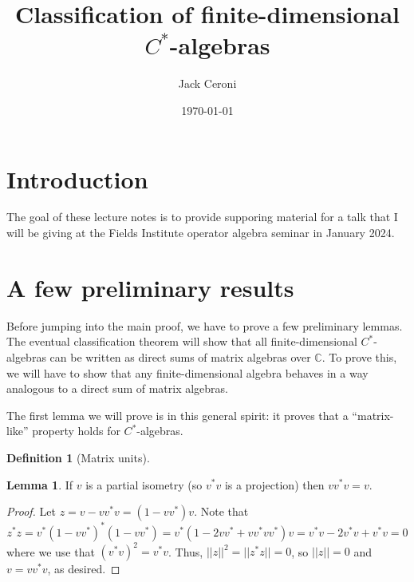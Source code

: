 \documentclass[aps,pra,showpacs,notitlepage,onecolumn,superscriptaddress,nofootinbib]{revtex4-1}
\theoremstyle{definition}
\newtheorem{definition}{Definition}[section]
\newtheorem{lemma}{Lemma}[section]
\begin{document}
\title{Classification of finite-dimensional $C^{*}$-algebras}
\author{Jack Ceroni}

\date{\today}

\maketitle

\section{Introduction}

\noindent The goal of these lecture notes is to provide supporing material for a talk that I will be giving at the Fields Institute operator algebra seminar in January 2024.

\section{A few preliminary results}

\noindent Before jumping into the main proof, we have to prove a few preliminary lemmas. The eventual classification theorem will show that
all finite-dimensional $C^{*}$-algebras can be written as direct sums of matrix algebras over $\mathbb{C}$. To prove this, we will have
to show that any finite-dimensional algebra behaves in a way analogous to a direct sum of matrix algebras.

The first lemma we will prove is in this general spirit: it proves that a ``matrix-like'' property holds for $C^{*}$-algebras.

\begin{definition}[Matrix units]
  
\end{definition}

\begin{lemma}
If $v$ is a partial isometry (so $v^{*} v$ is a projection) then $v v^{*} v = v$.
\end{lemma}
\begin{proof}
  Let $z = v - v v^{*} v = (1 - v v^{*})v$. Note that
  \begin{equation}
    z^{*} z = v^{*} (1 - v v^{*})^{*} (1 - v v^{*}) = v^{*} (1 - 2 v v^{*} +  v v^{*} v v^{*}) v = v^{*} v - 2 v^{*} v + v^{*} v = 0
  \end{equation}
  where we use that $(v^{*} v)^2 = v^{*} v$. Thus, $||z||^2 = ||z^{*} z|| = 0$, so $||z|| = 0$ and $v = v v^{*} v$, as desired.
  \end{proof}
\end{document}
